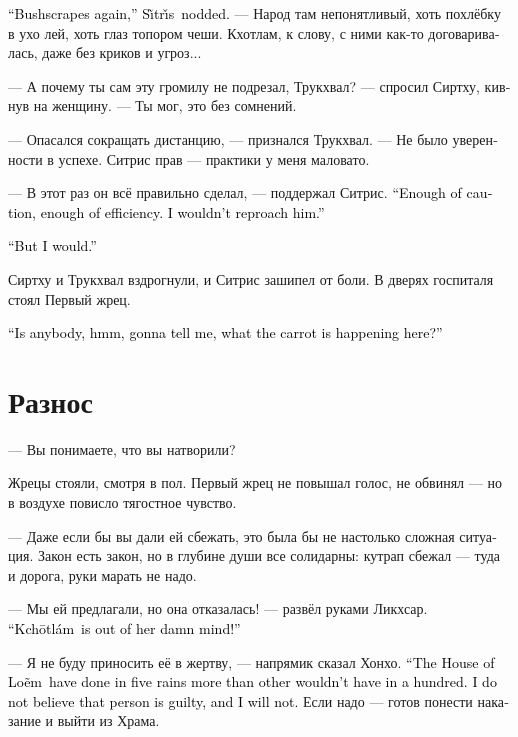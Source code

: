 \documentclass[a4paper,12pt,fleqn]{book}\usepackage{cooltooltips}\usepackage{polyglossia}\setdefaultlanguage{russian}\setotherlanguage{english}\defaultfontfeatures{Ligatures=TeX,Mapping=tex-text} \usepackage{xcolor}\definecolor{lightgray}{HTML}{bbbbbb}\color{lightgray}\newcommand{\ml}[3]{\textenglish{\textcolor{black}{#3}}}
\newcommand{\Kchotlam}{Kch\={o}tl\'{a}m}
\newcommand{\Loem}{Lo\~{e}m}
\newcommand{\Sitris}{S\~{\i}tr\v{\i}s}
\begin{document}
\ml{$0$}
{--- И опять Кустодралы, --- кивнул Ситрис.}
{``Bushscrapes again,'' \Sitris\ nodded.}
--- Народ там непонятливый, хоть похлёбку в ухо лей, хоть глаз топором чеши.
Кхотлам, к слову, с ними как-то договаривалась, даже без криков и угроз...

--- А почему ты сам эту громилу не подрезал, Трукхвал? --- спросил Сиртху, кивнув на женщину.
--- Ты мог, это без сомнений.

--- Опасался сокращать дистанцию, --- признался Трукхвал.
--- Не было уверенности в успехе.
Ситрис прав --- практики у меня маловато.

--- В этот раз он всё правильно сделал, --- поддержал Ситрис.
\ml{$0$}
{--- В меру осторожно, в меру эффективно.}
{``Enough of caution, enough of efficiency.}
\ml{$0$}
{Претензий нет.}
{I wouldn't reproach him.''}

\ml{$0$}
{--- А у меня есть.}
{``But I would.''}

Сиртху и Трукхвал вздрогнули, и Ситрис зашипел от боли.
В дверях госпиталя стоял Первый жрец.

\ml{$0$}
{--- Кто-нибудь, ммм, собирается объяснить мне, что за морковка тут происходит?}
{``Is anybody, hmm, gonna tell me, what the carrot is happening here?''}

\section{Разнос}

--- Вы понимаете, что вы натворили?

Жрецы стояли, смотря в пол.
Первый жрец не повышал голос, не обвинял --- но в воздухе повисло тягостное чувство.

--- Даже если бы вы дали ей сбежать, это была бы не настолько сложная ситуация.
Закон есть закон, но в глубине души все солидарны: кутрап сбежал --- туда и дорога, руки марать не надо.

--- Мы ей предлагали, но она отказалась! --- развёл руками Ликхсар.
\ml{$0$}
{--- Кхотлам выжила из ума!}
{``\Kchotlam\ is out of her damn mind!''}

--- Я не буду приносить её в жертву, --- напрямик сказал Хонхо.
\ml{$0$}
{--- Двор Люм за пять дождей сделал то, чего не удавалось другим за сотню.}
{``The House of \Loem\ have done in five rains more than other wouldn't have in a hundred.}
\ml{$0$}
{Я не верю в виновность этого человека, и не поверю.}
{I do not believe that person is guilty, and I will not.}
Если надо --- готов понести наказание и выйти из Храма.
\end{document}
